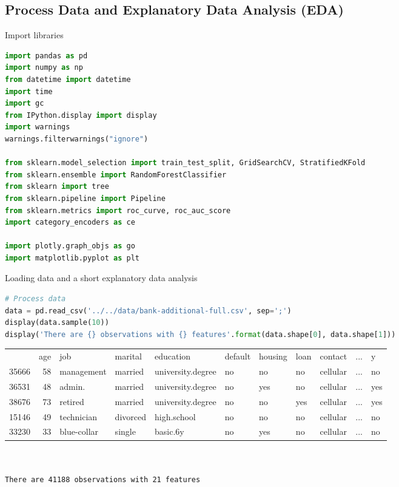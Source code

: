\documentclass[11pt,a4paper]{article}
\begin{document}
    \subsection{Process Data and Explanatory Data Analysis (EDA)}
    Import libraries
\begin{lstlisting}[language = Python]
import pandas as pd
import numpy as np
from datetime import datetime
import time
import gc
from IPython.display import display
import warnings
warnings.filterwarnings("ignore")

from sklearn.model_selection import train_test_split, GridSearchCV, StratifiedKFold
from sklearn.ensemble import RandomForestClassifier
from sklearn import tree
from sklearn.pipeline import Pipeline
from sklearn.metrics import roc_curve, roc_auc_score
import category_encoders as ce

import plotly.graph_objs as go
import matplotlib.pyplot as plt
\end{lstlisting}

    \noindent Loading data and a short explanatory data analysis
\begin{lstlisting}[language = Python]
# Process data
data = pd.read_csv('../../data/bank-additional-full.csv', sep=';')
display(data.sample(10))
display('There are {} observations with {} features'.format(data.shape[0], data.shape[1]))
\end{lstlisting}

    \noindent
    \begin{tabular}{lrlllllllcl}
        {} &  age &          job &   marital &          education & default & housing & loan &   contact & ... & y\\
        
        35666 &   58 &   management &   married &  university.degree &      no &      no &   no &  cellular & ... & no \\
        36531 &   48 &       admin. &   married &  university.degree &      no &     yes &   no &  cellular & ... & yes \\
        38676 &   73 &      retired &   married &  university.degree &      no &      no &  yes &  cellular & ... & yes \\
        15146 &   49 &   technician &  divorced &        high.school &      no &      no &   no &  cellular & ... & no \\
        33230 &   33 &  blue-collar &    single &           basic.6y &      no &     yes &   no &  cellular & ... & no \\
    \end{tabular} \\ \\
    \texttt{There are 41188 observations with 21 features}
    
\end{document}
